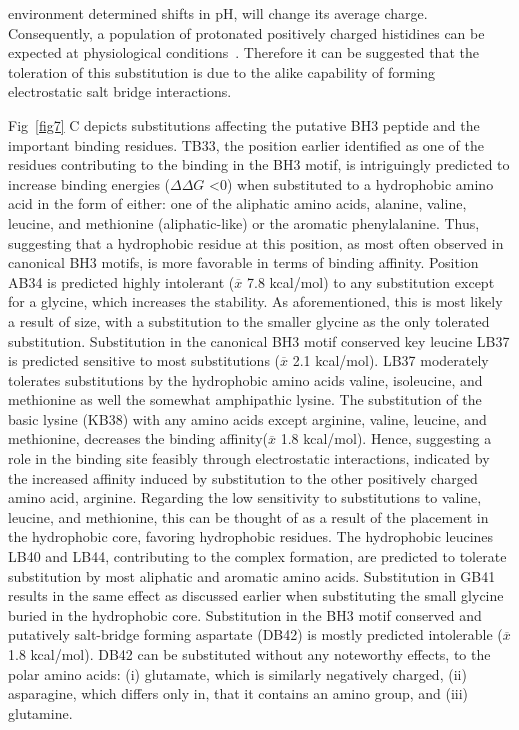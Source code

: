 \documentclass[10pt,letterpaper]{article}
\begin{document}
environment determined shifts in pH, will change its average charge. Consequently, a population of protonated positively charged histidines can be expected at physiological conditions~\cite{Betts2007}. Therefore it can be suggested that the toleration of this substitution is due to the alike capability of forming electrostatic salt bridge interactions. 

\smallskip

Fig~\ref{fig7} C depicts substitutions affecting the putative BH3 peptide and the important binding residues. TB33, the position earlier identified as one of the residues contributing to the binding in the BH3 motif, is intriguingly predicted to increase binding energies ($\Delta\Delta G$ \textless0) when substituted to a hydrophobic amino acid in the form of either: one of the aliphatic amino acids, alanine, valine, leucine, and methionine (aliphatic-like) or the aromatic phenylalanine. Thus, suggesting that a hydrophobic residue at this position, as most often observed in canonical BH3 motifs, is more favorable in terms of binding affinity. Position AB34 is predicted highly intolerant ($\overline{x}$ 7.8 kcal/mol) to any substitution except for a glycine, which increases the stability. As aforementioned, this is most likely a result of size, with a substitution to the smaller glycine as the only tolerated substitution. Substitution in the canonical BH3 motif conserved key leucine LB37 is predicted sensitive to most substitutions ($\overline{x}$ 2.1 kcal/mol). LB37 moderately tolerates substitutions by the hydrophobic amino acids valine, isoleucine, and methionine as well the somewhat amphipathic lysine. The substitution of the basic lysine (KB38) with any amino acids except arginine, valine, leucine, and methionine, decreases the binding affinity($\overline{x}$ 1.8 kcal/mol). Hence, suggesting a role in the binding site feasibly through electrostatic interactions, indicated by the increased affinity induced by substitution to the other positively charged amino acid, arginine. Regarding the low sensitivity to substitutions to valine, leucine, and methionine, this can be thought of as a result of the placement in the hydrophobic core, favoring hydrophobic residues.
The hydrophobic leucines LB40 and LB44, contributing to the complex formation, are predicted to tolerate substitution by most aliphatic and aromatic amino acids. Substitution in GB41 results in the same effect as discussed earlier when substituting the small glycine buried in the hydrophobic core. Substitution in the BH3 motif conserved and putatively salt-bridge forming aspartate (DB42) is mostly predicted intolerable ($\overline{x}$ 1.8 kcal/mol). DB42 can be substituted without any noteworthy effects, to the polar amino acids: (i) glutamate, which is similarly negatively charged, (ii) asparagine, which differs only in, that it contains an amino group, and (iii) glutamine.  
\end{document}
